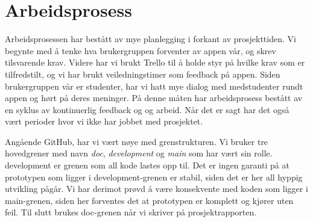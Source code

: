 \section{Arbeidsprosess}
Arbeidsprosessen har bestått av mye planlegging i forkant av prosjekttiden. Vi begynte med å tenke hva brukergruppen forventer av appen vår, og skrev tilsvarende krav. Videre har vi brukt Trello til å holde styr på hvilke krav som er tilfredstilt, og vi har brukt veiledningstimer som feedback på appen. Siden brukergruppen vår er studenter, har vi hatt mye dialog med medstudenter rundt appen og hørt på deres meninger. På denne måten har arbeidsprosess bestått av en syklus av kontinuerlig feedback og og arbeid. Når det er sagt har det også vært perioder hvor vi ikke har jobbet med prosjektet.

Angående GitHub, har vi vært nøye med grenstrukturen. Vi bruker tre hovedgrener med navn \textit{doc}, \textit{development} og \textit{main} som har vært sin rolle. development er grenen som all kode lastes opp til. Det er ingen garanti på at prototypen som ligger i development-grenen er stabil, siden det er her all hyppig utvikling pågår. Vi har derimot prøvd å være konsekvente med koden som ligger i main-grenen, siden her forventes det at prototypen er komplett og kjører uten feil. Til slutt brukes doc-grenen når vi skriver på prosjektrapporten.